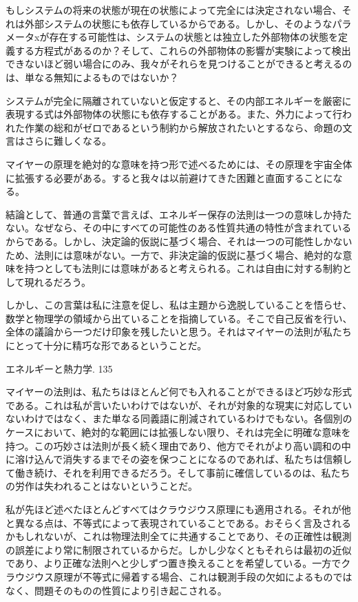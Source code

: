 \documentclass[a4paper,11pt,openany]{ltjsbook}
\begin{document}
もしシステムの将来の状態が現在の状態によって完全には決定されない場合、それは外部システムの状態にも依存しているからである。しかし、そのようなパラメータxが存在する可能性は、システムの状態とは独立した外部物体の状態を定義する方程式があるのか？そして、これらの外部物体の影響が実験によって検出できないほど弱い場合にのみ、我々がそれらを見つけることができると考えるのは、単なる無知によるものではないか？

システムが完全に隔離されていないと仮定すると、その内部エネルギーを厳密に表現する式は外部物体の状態にも依存することがある。また、外力によって行われた作業の総和がゼロであるという制約から解放されたいとするなら、命題の文言はさらに難しくなる。

マイヤーの原理を絶対的な意味を持つ形で述べるためには、その原理を宇宙全体に拡張する必要がある。すると我々は以前避けてきた困難と直面することになる。

結論として、普通の言葉で言えば、エネルギー保存の法則は一つの意味しか持たない。なぜなら、その中にすべての可能性のある性質共通の特性が含まれているからである。しかし、決定論的仮説に基づく場合、それは一つの可能性しかないため、法則には意味がない。一方で、非決定論的仮説に基づく場合、絶対的な意味を持つとしても法則には意味があると考えられる。これは自由に対する制約として現れるだろう。

しかし、この言葉は私に注意を促し、私は主題から逸脱していることを悟らせ、数学と物理学の領域から出ていることを指摘している。そこで自己反省を行い、全体の議論から一つだけ印象を残したいと思う。それはマイヤーの法則が私たちにとって十分に精巧な形であるということだ。

エネルギーと熱力学. 135

マイヤーの法則は、私たちはほとんど何でも入れることができるほど巧妙な形式である。これは私が言いたいわけではないが、それが対象的な現実に対応していないわけではなく、また単なる同義語に削減されているわけでもない。各個別のケースにおいて、絶対的な範囲には拡張しない限り、それは完全に明確な意味を持つ。この巧妙さは法則が長く続く理由であり、他方でそれがより高い調和の中に溶け込んで消失するまでその姿を保つことになるのであれば、私たちは信頼して働き続け、それを利用できるだろう。そして事前に確信しているのは、私たちの労作は失われることはないということだ。

私が先ほど述べたほとんどすべてはクラウジウス原理にも適用される。それが他と異なる点は、不等式によって表現されていることである。おそらく言及されるかもしれないが、これは物理法則全てに共通することであり、その正確性は観測の誤差により常に制限されているからだ。しかし少なくともそれらは最初の近似であり、より正確な法則へと少しずつ置き換えることを希望している。一方でクラウジウス原理が不等式に帰着する場合、これは観測手段の欠如によるものではなく、問題そのものの性質により引き起こされる。
\end{document}
